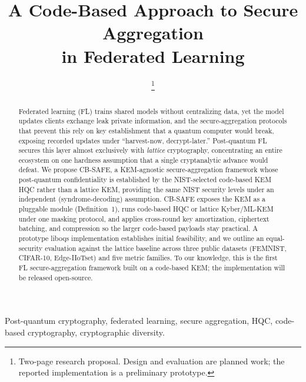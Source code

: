 \documentclass[conference]{IEEEtran}
\begin{document}
\title{A Code-Based Approach to Secure Aggregation\\ in Federated Learning}

\author{
\thanks{Two-page research proposal. Design and evaluation are planned work; the reported
implementation is a preliminary prototype.}
}

\maketitle

\begin{abstract}
Federated learning (FL) trains shared models without centralizing data, yet the model updates
clients exchange leak private information, and the secure-aggregation protocols that prevent this
rely on key establishment that a quantum computer would break, exposing recorded updates under
``harvest-now, decrypt-later.'' Post-quantum FL secures this layer almost exclusively with
\emph{lattice} cryptography, concentrating an entire ecosystem on one hardness assumption that a
single cryptanalytic advance would defeat. We propose CB-SAFE, a KEM-agnostic secure-aggregation
framework whose post-quantum confidentiality is established by the NIST-selected code-based KEM
HQC rather than a lattice KEM, providing the same NIST security levels under an independent
(syndrome-decoding) assumption. CB-SAFE exposes the KEM as a pluggable module (Definition~1), runs
code-based HQC or lattice Kyber/ML-KEM under one masking protocol, and applies cross-round key
amortization, ciphertext batching, and compression so the larger code-based payloads stay
practical. A prototype liboqs implementation establishes initial feasibility, and we outline an
equal-security evaluation against the lattice baseline across three public datasets (FEMNIST,
CIFAR-10, Edge-IIoTset) and five metric families. To our knowledge, this is the first FL
secure-aggregation framework built on a code-based KEM; the implementation will be released
open-source.
\end{abstract}

\begin{IEEEkeywords}
Post-quantum cryptography, federated learning, secure aggregation, HQC, code-based cryptography,
cryptographic diversity.
\end{IEEEkeywords}
\end{document}
